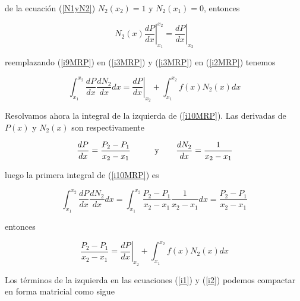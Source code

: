 \documentclass[10pt,a4paper]{article}
\begin{document}
\noindent de la ecuaci\'on (\ref{N1yN2}) $N_2(x_2)=1$ y $N_2(x_1)=0$, entonces

\begin{equation}\label{i9MRP}
 N_2(x) \left .\frac{dP}{dx} \right |_{x_1}^{x_2}= \left .\frac{dP}{dx}\right |_{x_2}
\end{equation}

\noindent reemplazando (\ref{i9MRP}) en (\ref{i3MRP}) y (\ref{i3MRP}) en (\ref{i2MRP}) tenemos

\begin{equation}\label{i10MRP}
 \int_{x_1}^{x_2} \frac{dP}{dx}\frac{dN_2}{dx}dx=\left .\frac{dP}{dx}\right |_{x_2}+\int_{x_1}^{x_2}f(x)N_2(x)dx 
\end{equation}

Resolvamos ahora la integral de la izquierda de (\ref{i10MRP}). Las derivadas de $P(x)$ y $N_2(x)$ son respectivamente

\begin{equation}\label{dTdx_2}
  \displaystyle \frac{dP}{dx}=\frac{P_2-P_1}{x_2-x_1} \hspace*{0.9cm} \mbox { y } \hspace*{0.6cm} \frac{dN_2}{dx}=\frac{1}{x_2-x_1} 
\end{equation}

\noindent luego la primera integral de (\ref{i10MRP}) es

\begin{equation}\label{i11MRP}
 \int_{x_1}^{x_2} \frac{dP}{dx}\frac{dN_2}{dx}dx=\int_{x_1}^{x_2}\frac{P_2-P_1}{x_2-x_1}\frac{1}{x_2-x_1}dx=\frac{P_2-P_1}{x_2-x_1}
\end{equation}

\noindent entonces

\begin{equation}\label{i2}
 \frac{P_2-P_1}{x_2-x_1}=\left .\frac{dP}{dx}\right |_{x_2}+\int_{x_1}^{x_2}f(x)N_2(x)dx
\end{equation}

Los t\'erminos de la izquierda en las ecuaciones (\ref{i1}) y (\ref{i2}) podemos compactar en forma matricial como sigue
\end{document}

